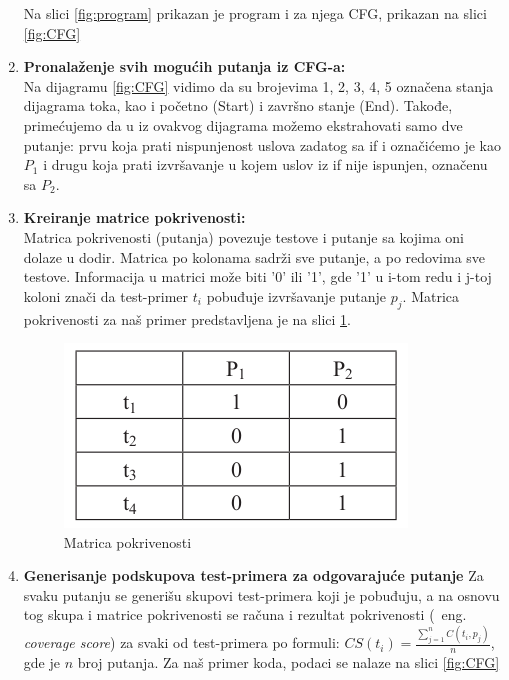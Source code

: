 \documentclass[a4paper]{article}
\begin{document}
\begin{enumerate}
        
        Na slici \ref{fig:program} prikazan je program i za njega CFG, prikazan na slici \ref{fig:CFG}
    \item \textbf{Pronalaženje svih mogućih putanja iz CFG-a:}\\
        Na dijagramu \ref{fig:CFG} vidimo da su brojevima 1, 2, 3, 4, 5 označena stanja dijagrama toka, kao i početno (Start) i završno stanje (End). Takođe, primećujemo da u iz ovakvog dijagrama možemo ekstrahovati samo dve putanje: prvu koja prati nispunjenost uslova zadatog sa if i označićemo je kao $P_1$ i drugu koja prati izvršavanje u kojem uslov iz if nije ispunjen, označenu sa $P_2$.
    \item \textbf{Kreiranje matrice pokrivenosti:} \\
        Matrica pokrivenosti (putanja) povezuje testove i putanje sa kojima oni dolaze u dodir. Matrica po kolonama sadrži sve putanje, a po redovima sve testove. Informacija u matrici može biti '0' ili '1', gde '1' u i-tom redu i j-toj koloni znači da test-primer $t_i$ pobuđuje izvršavanje putanje $p_j$. Matrica pokrivenosti za naš primer predstavljena je na slici \ref{fig:pokrivenost}.
        \begin{figure}[h!]
        \begin{center}
        \includegraphics[scale=0.4]{Coverage.png}
        \end{center}
        \caption{Matrica pokrivenosti}
        \label{fig:pokrivenost}
        \end{figure}
    \item \textbf{Generisanje podskupova test-primera za odgovarajuće putanje}
    Za svaku putanju se generišu skupovi test-primera koji je pobuđuju, a na osnovu tog skupa i matrice pokrivenosti se računa i rezultat pokrivenosti (~eng. \textit{coverage score}) za svaki od test-primera po formuli: $CS(t_i) = \frac{\sum_{j=1}^{n}C(t_i, p_j)}{n} $, gde je $n$ broj putanja.
    Za naš primer koda, podaci se nalaze na slici
    \ref{fig:CFG}
        \begin{figure}[h!]
        \begin{center}

\end{center}
\end{figure}
\end{enumerate}
\end{document}
